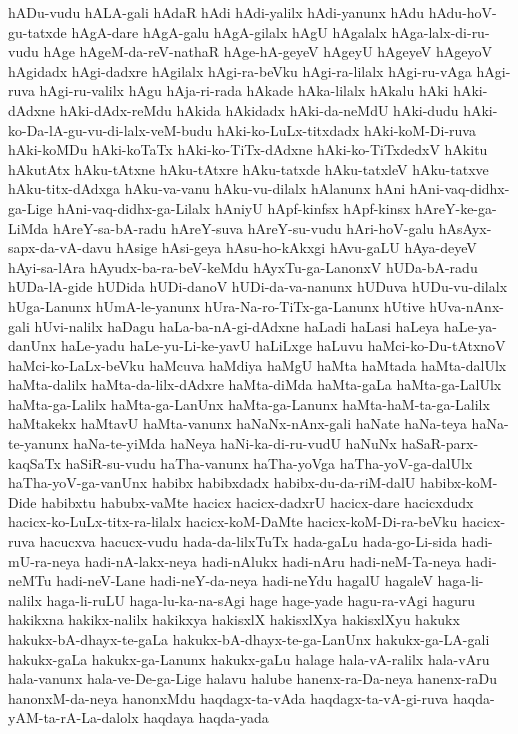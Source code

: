 {hADu-vudu
hALA-gali
hAdaR
hAdi
hAdi-yalilx
hAdi-yanunx
hAdu
hAdu-hoV-gu-tatxde
hAgA-dare
hAgA-galu
hAgA-gilalx
hAgU
hAgalalx
hAga-lalx-di-ru-vudu
hAge
hAgeM-da-reV-nathaR
hAge-hA-geyeV
hAgeyU
hAgeyeV
hAgeyoV
hAgidadx
hAgi-dadxre
hAgilalx
hAgi-ra-beVku
hAgi-ra-lilalx
hAgi-ru-vAga
hAgi-ruva
hAgi-ru-valilx
hAgu
hAja-ri-rada
hAkade
hAka-lilalx
hAkalu
hAki
hAki-dAdxne
hAki-dAdx-reMdu
hAkida
hAkidadx
hAki-da-neMdU
hAki-dudu
hAki-ko-Da-lA-gu-vu-di-lalx-veM-budu
hAki-ko-LuLx-titxdadx
hAki-koM-Di-ruva
hAki-koMDu
hAki-koTaTx
hAki-ko-TiTx-dAdxne
hAki-ko-TiTxdedxV
hAkitu
hAkutAtx
hAku-tAtxne
hAku-tAtxre
hAku-tatxde
hAku-tatxleV
hAku-tatxve
hAku-titx-dAdxga
hAku-va-vanu
hAku-vu-dilalx
hAlanunx
hAni
hAni-vaq-didhx-ga-Lige
hAni-vaq-didhx-ga-Lilalx
hAniyU
hApf-kinfsx
hApf-kinsx
hAreY-ke-ga-LiMda
hAreY-sa-bA-radu
hAreY-suva
hAreY-su-vudu
hAri-hoV-galu
hAsAyx-sapx-da-vA-davu
hAsige
hAsi-geya
hAsu-ho-kAkxgi
hAvu-gaLU
hAya-deyeV
hAyi-sa-lAra
hAyudx-ba-ra-beV-keMdu
hAyxTu-ga-LanonxV
hUDa-bA-radu
hUDa-lA-gide
hUDida
hUDi-danoV
hUDi-da-va-nanunx
hUDuva
hUDu-vu-dilalx
hUga-Lanunx
hUmA-le-yanunx
hUra-Na-ro-TiTx-ga-Lanunx
hUtive
hUva-nAnx-gali
hUvi-nalilx
haDagu
haLa-ba-nA-gi-dAdxne
haLadi
haLasi
haLeya
haLe-ya-danUnx
haLe-yadu
haLe-yu-Li-ke-yavU
haLiLxge
haLuvu
haMci-ko-Du-tAtxnoV
haMci-ko-LaLx-beVku
haMcuva
haMdiya
haMgU
haMta
haMtada
haMta-dalUlx
haMta-dalilx
haMta-da-lilx-dAdxre
haMta-diMda
haMta-gaLa
haMta-ga-LalUlx
haMta-ga-Lalilx
haMta-ga-LanUnx
haMta-ga-Lanunx
haMta-haM-ta-ga-Lalilx
haMtakekx
haMtavU
haMta-vanunx
haNaNx-nAnx-gali
haNate
haNa-teya
haNa-te-yanunx
haNa-te-yiMda
haNeya
haNi-ka-di-ru-vudU
haNuNx
haSaR-parx-kaqSaTx
haSiR-su-vudu
haTha-vanunx
haTha-yoVga
haTha-yoV-ga-dalUlx
haTha-yoV-ga-vanUnx
habibx
habibxdadx
habibx-du-da-riM-dalU
habibx-koM-Dide
habibxtu
habubx-vaMte
hacicx
hacicx-dadxrU
hacicx-dare
hacicxdudx
hacicx-ko-LuLx-titx-ra-lilalx
hacicx-koM-DaMte
hacicx-koM-Di-ra-beVku
hacicx-ruva
hacucxva
hacucx-vudu
hada-da-lilxTuTx
hada-gaLu
hada-go-Li-sida
hadi-mU-ra-neya
hadi-nA-lakx-neya
hadi-nAlukx
hadi-nAru
hadi-neM-Ta-neya
hadi-neMTu
hadi-neV-Lane
hadi-neY-da-neya
hadi-neYdu
hagalU
hagaleV
haga-li-nalilx
haga-li-ruLU
haga-lu-ka-na-sAgi
hage
hage-yade
hagu-ra-vAgi
haguru
hakikxna
hakikx-nalilx
hakikxya
hakisxlX
hakisxlXya
hakisxlXyu
hakukx
hakukx-bA-dhayx-te-gaLa
hakukx-bA-dhayx-te-ga-LanUnx
hakukx-ga-LA-gali
hakukx-gaLa
hakukx-ga-Lanunx
hakukx-gaLu
halage
hala-vA-ralilx
hala-vAru
hala-vanunx
hala-ve-De-ga-Lige
halavu
halube
hanenx-ra-Da-neya
hanenx-raDu
hanonxM-da-neya
hanonxMdu
haqdagx-ta-vAda
haqdagx-ta-vA-gi-ruva
haqda-yAM-ta-rA-La-dalolx
haqdaya
haqda-yada
}
